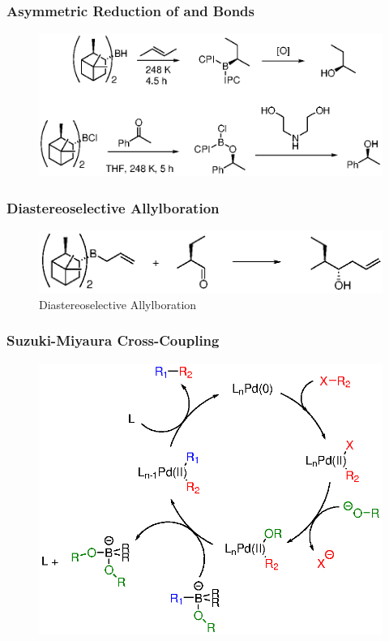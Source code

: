 \begin{frame}
\frametitle{Asymmetric Reduction of  and  Bonds}
\begin{figure}
	\centering
	\includegraphics[width=0.9\linewidth]{fig/AsymmetricReduction}
	\label{fig:asymmetricreduction}
\end{figure}

\end{frame}

\begin{frame}
\frametitle{Diastereoselective Allylboration}
\begin{figure}
	\centering
	\includegraphics[width=0.8\linewidth]{fig/diastereo}
	\caption{Diastereoselective Allylboration}
	\label{fig:diastereo}
\end{figure}

\end{frame}

\begin{frame}
	\frametitle{Suzuki-Miyaura Cross-Coupling}
	\begin{figure}
		\centering
		\includegraphics[width=0.7\linewidth]{fig/suzuki-miyaura}
		\label{fig:suzuki-miyaura}
	\end{figure}
	
\end{frame}